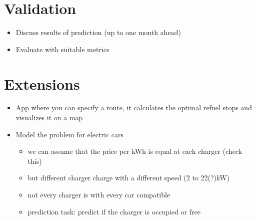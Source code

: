 \documentclass[%
a4paper,
DIV12,
2.5headlines,
bigheadings,
titlepage,
openbib,
]{scrartcl}
\begin{document}
\section{Validation}\label{validation}
\begin{itemize}
\item Discuss results of prediction (up to one month ahead)
\item Evaluate with suitable metrics
\end{itemize}


\section{Extensions}\label{extensions}
\begin{itemize}
\item App where you can specify a route, it calculates the optimal refuel stops and visualizes it on a map
\item Model the problem for electric cars

\begin{itemize}
\item we can assume that the price per kWh is equal at each charger (check this)\\
\item but different charger charge with a different speed (2 to 22(?)kW)\\
\item not every charger is with every car compatible\\
\item prediction task: predict if the charger is occupied or free\\
\end{itemize}
\end{itemize}


 
\end{document}
